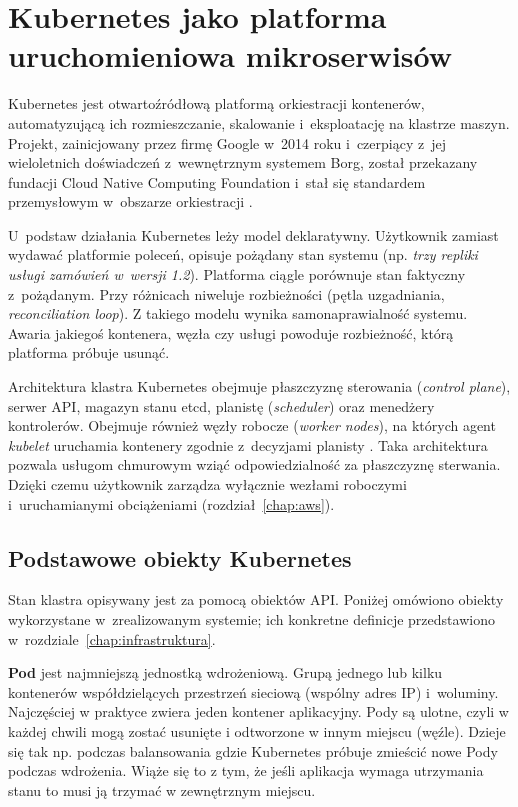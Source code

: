 \chapter{Kubernetes jako platforma uruchomieniowa mikroserwisów}
\label{chap:kubernetes}

Kubernetes jest otwartoźródłową platformą orkiestracji kontenerów, automatyzującą ich rozmieszczanie, skalowanie
i~eksploatację na klastrze maszyn. Projekt, zainicjowany przez firmę Google w~2014 roku i~czerpiący z~jej
wieloletnich doświadczeń z~wewnętrznym systemem Borg, został przekazany fundacji Cloud Native Computing Foundation
i~stał się standardem przemysłowym w~obszarze orkiestracji \parencite{burns2022}.

U~podstaw działania Kubernetes leży model deklaratywny. Użytkownik zamiast wydawać platformie poleceń, opisuje
pożądany stan systemu (np. \emph{trzy repliki usługi zamówień w~wersji 1.2}). Platforma ciągle porównuje stan
faktyczny z~pożądanym. Przy różnicach niweluje rozbieżności (pętla uzgadniania, \emph{reconciliation loop}).
Z takiego modelu wynika samonaprawialność systemu. Awaria jakiegoś kontenera, węzła czy usługi powoduje rozbieżność,
którą platforma próbuje usunąć.

Architektura klastra Kubernetes obejmuje płaszczyznę sterowania (\emph{control plane}), serwer API, magazyn
stanu etcd, planistę (\emph{scheduler}) oraz menedżery kontrolerów. Obejmuje również węzły robocze (\emph{worker nodes}),
na których agent \emph{kubelet} uruchamia kontenery zgodnie z~decyzjami planisty \parencite{k8sdocs}. Taka architektura
pozwala usługom chmurowym wziąć odpowiedzialność za płaszczyznę sterwania. Dzięki czemu użytkownik zarządza wyłącznie
wezłami roboczymi i~uruchamianymi obciążeniami (rozdział~\ref{chap:aws}).

\section{Podstawowe obiekty Kubernetes}
\label{sec:podstawowe-obiekty-kubernetes}

Stan klastra opisywany jest za pomocą obiektów API. Poniżej omówiono obiekty wykorzystane w~zrealizowanym systemie;
ich konkretne definicje przedstawiono w~rozdziale~\ref{chap:infrastruktura}.

\textbf{Pod} jest najmniejszą jednostką wdrożeniową. Grupą jednego lub kilku kontenerów współdzielących przestrzeń
sieciową (wspólny adres IP) i~woluminy. Najczęściej w praktyce zwiera jeden kontener aplikacyjny. Pody są ulotne,
czyli w każdej chwili mogą zostać usunięte i odtworzone w innym miejscu (węźle). Dzieje się tak np. podczas balansowania
gdzie Kubernetes próbuje zmieścić nowe Pody podczas wdrożenia. Wiąże się to z tym, że jeśli aplikacja wymaga utrzymania stanu
to musi ją trzymać w zewnętrznym miejscu.

